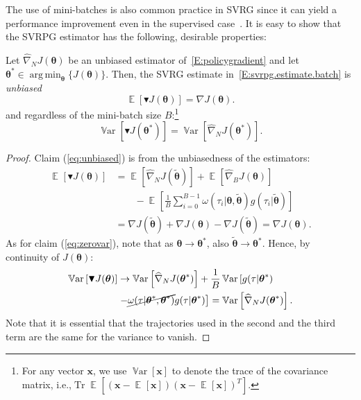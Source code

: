 \documentclass{article}
\makeatletter
\theoremstyle{remark}
\theoremstyle{definition}
\DeclareRobustCommand{\ie}{i.e.,\@\xspace}
\DeclareMathOperator*{\argmin}{arg\,min}
\DeclareMathOperator*{\EV}{\mathbb{E}}
\DeclareMathOperator{\Tr}{Tr}
\DeclareMathOperator*{\Var}{\mathbb{V}ar}
\newcommand{\EVV}[2][\ppvect \in \ppspace]{\EV_{#1}\left[{#2}\right]}
\newcommand{\vtheta}{\boldsymbol{\theta}}
\newcommand{\Reward}{\mathcal{R}}
\newcommand{\gradJ}[1]{\nabla J(#1)}
\newcommand{\gradApp}[2]{\widehat{\nabla}_{#2}J(#1)}
\newcommand{\gradBlack}[1]{\blacktriangledown J(#1)}
\newcommand{\wt}[1]{\widetilde{#1}}
\newcommand{\wh}[1]{\widehat{#1}}
\makeatother
\begin{document}
The use of mini-batches is also common practice in SVRG since it can yield a performance improvement even in the supervised case~\citep{harikandeh2015stopwasting,konevcny2016mini}. It is easy to show that the SVRPG estimator has the following, desirable properties:
\begin{lemma}\label{L:svrpg.properties}
        Let $\wh{\nabla}_N J(\vtheta)$ be an unbiased estimator of~\eqref{E:policygradient}
and let $\vtheta^* \in \argmin_{\vtheta} \{J(\vtheta)\}$. Then, the SVRG estimate in~\eqref{E:svrpg.estimate.batch} is \emph{unbiased}
\begin{equation}\label{eq:unbiased}
\mathop{\mathbb{E}}
\left[\blacktriangledown J(\vtheta)\right] = \gradJ{\vtheta}.
\end{equation}
and regardless of the mini-batch size $B$:\footnote{
For any vector $\mathbf{x}$, we use $\Var[\mathbf{x}]$ to denote the trace of the covariance matrix, \ie $\Tr\EVV[]{(\mathbf{x}-\EVV[]{\mathbf{x}})(\mathbf{x}-\EVV[]{\mathbf{x}})^T}$.}
\begin{equation}\label{eq:zerovar}
	\Var\left[\gradBlack{\vtheta^*}\right] = 
    \Var\left[\wh{\nabla}_N J(\vtheta^*)\right].
\end{equation}
\end{lemma}
\begin{proof}
Claim (\ref{eq:unbiased}) is from the unbiasedness of the estimators:
\begin{align*}
\EVV[]{\gradBlack{\vtheta}} &= \EVV[]{\gradApp{\wt{\vtheta}}{N}}  + \EVV[]{\gradApp{\vtheta}{B}} \\
&\qquad- \EVV[]{\frac{1}{B}\sum_{i=0}^{B-1}\omega(\tau_i|\vtheta, \wt{\vtheta}) g(\tau_i|\wt{\vtheta})} \\
&= \gradJ{\wt{\vtheta}} + \gradJ{\vtheta} - \gradJ{\wt{\vtheta}} = \gradJ{\vtheta}.
\end{align*}
As for claim (\ref{eq:zerovar}), note that as $\vtheta\to\vtheta^*$, also $\wt{\vtheta}\to\vtheta^*$. Hence, by continuity of $J(\vtheta)$:
\begin{align*}
\Var\left[\gradBlack{\vtheta}\right] &\to \Var\left[\gradApp{\vtheta^*}{N}\right] + \frac{1}{B}\Var\left[g(\tau|\vtheta^*)\right. \\
&\left.- \cancel{\omega(\tau|\vtheta^*,\vtheta^*)}g(\tau|\vtheta^*)\right]
= \Var\left[\gradApp{\vtheta^*}{N}\right].
\end{align*}
Note that it is essential that the trajectories used in the second and the third term are the same for the variance to vanish.
\end{proof}
\end{document}
